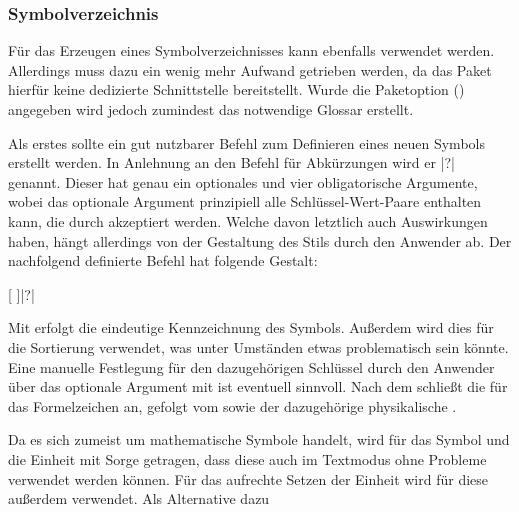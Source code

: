 \documentclass[%
  english,ngerman,%
  cdgeometry=no,DIV=12,automark,%
]{tudscrartcl}
\begin{document}
\subsubsection{Symbolverzeichnis}
Für das Erzeugen eines Symbolverzeichnisses kann ebenfalls  
verwendet werden. Allerdings muss dazu ein wenig mehr Aufwand getrieben werden, 
da das Paket hierfür keine dedizierte Schnittstelle bereitstellt. Wurde die 
Paketoption () angegeben wird jedoch 
zumindest das notwendige Glossar erstellt.

Als erstes sollte ein gut nutzbarer Befehl zum Definieren eines neuen Symbols 
erstellt werden. In Anlehnung an den Befehl für Abkürzungen  
wird er |?| genannt. Dieser hat genau ein optionales und vier 
obligatorische Argumente, wobei das optionale Argument prinzipiell alle 
Schlüssel-Wert-Paare enthalten kann, die durch  akzeptiert 
werden. Welche davon letztlich auch Auswirkungen haben, hängt allerdings von 
der Gestaltung des Stils durch den Anwender ab. Der nachfolgend definierte 
Befehl hat folgende Gestalt:
%
\begin{quoting}[leftmargin=\parindent]
[%
  \LParameter{}%
]|?|%
\end{quoting}
%
Mit  erfolgt die eindeutige Kennzeichnung des Symbols. Außerdem 
wird dies für die Sortierung verwendet, was unter Umständen etwas problematisch 
sein könnte. Eine manuelle Festlegung für den dazugehörigen Schlüssel durch den 
Anwender über das optionale Argument mit  ist 
eventuell sinnvoll. Nach dem  schließt die  für 
das Formelzeichen an, gefolgt vom  sowie der dazugehörige 
physikalische .
%
\CodeHook{\let\newcommand\renewcommand}
\begin{Preamble*}
\newcommand*{\newsymbol}[5][]{%
  \newglossaryentry{#2}{%
    type=symbols,%
    name={#3},%
    description={\nopostdesc},%
    symbol={\ensuremath{#4}},%
    user1={\ensuremath{\mathrm{#5}}},%
    sort={#2},%
    #1%
  }%
}

\end{Preamble*}
%
Da es sich zumeist um mathematische Symbole handelt, wird für das Symbol und 
die Einheit mit  Sorge getragen, dass diese auch im 
Textmodus ohne Probleme verwendet werden können. Für das aufrechte Setzen der 
Einheit wird für diese außerdem  verwendet. Als Alternative dazu 
\end{document}
